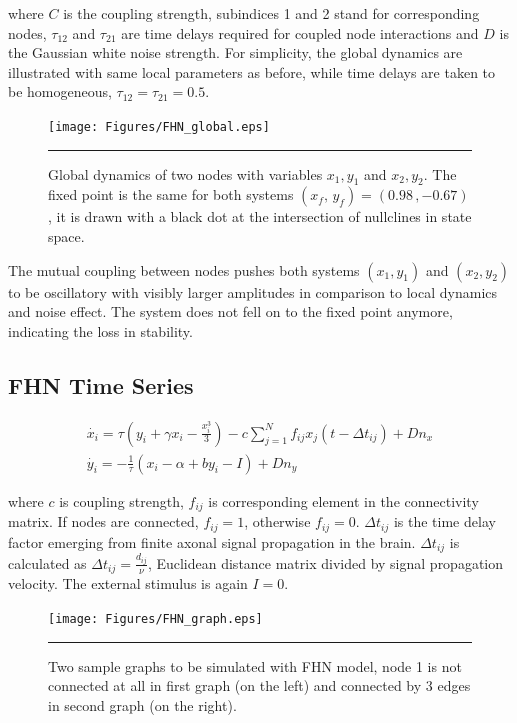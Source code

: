 where $C$ is the coupling strength, subindices 1 and 2 stand for corresponding nodes, $\tau_{12}$ and $\tau_{21}$ are time delays required for coupled node interactions and $D$ is the Gaussian white noise strength. For simplicity, the global dynamics are illustrated with same local parameters as before, while time delays are taken to be homogeneous, $\tau_{12}=\tau_{21}=0.5$.

\begin{figure}[htbp]
  \centering
	\texttt{[image: Figures/FHN\_global.eps]}
 
    \rule{35em}{0.5pt}
    \caption[FHN Global]{Global dynamics of two nodes with variables $x_1,y_1$ and  $x_2,y_2$. The fixed point is the same for both systems $(x_f, \, y_f) = (0.98 \, , -0.67 )$, it is drawn with a black dot at the intersection of nullclines in state space.}
  \label{fig:FHN Global}	
\end{figure}

The mutual coupling between nodes pushes both systems $(x_1,y_1)$ and $(x_2,y_2)$ to be oscillatory with visibly larger amplitudes in comparison to local dynamics and noise effect. The system does not fell on to the fixed point anymore, indicating the loss in stability. 

\subsection{FHN Time Series}
 
\begin{subequations}
 \begin{align}\dot{x_i} = \tau (y_i + \gamma x_i - \frac{x_i^3}{3}) -c \sum_{j=1}^N f_{ij}x_j(t - \Delta t_{ij}) +Dn_x \label{eqn: frobenius 17}\\  \dot{y_i} = -\frac{1}{\tau} (x_i - \alpha + b y_i - I ) +Dn_y \label{eqn: frobenius 18}   \end{align} 
\end{subequations}

where $c$ is coupling strength, $f_{ij}$ is corresponding element in the connectivity matrix. If nodes are connected, $f_{ij}=1$, otherwise $f_{ij}=0$. $\Delta t_{ij}$ is the time delay factor emerging from finite axonal signal propagation in the brain. $\Delta t_{ij}$ is calculated as $\Delta t_{ij}=\frac{d_{ij}}{\nu}$, Euclidean distance matrix divided by signal propagation velocity. The external stimulus is again $I=0$.
 
\begin{figure}[htbp]
  \centering
	\texttt{[image: Figures/FHN\_graph.eps]}
 
    \rule{35em}{0.5pt}
    \caption[FHN Graph]{Two sample graphs to be simulated with FHN model, node 1 is not connected at all in first graph (on the left) and connected by 3 edges in second graph (on the right).  }
  \label{fig:FHN Graph}	
\end{figure}


